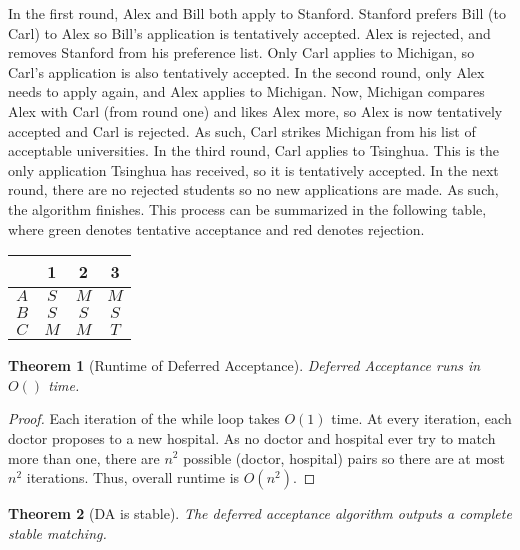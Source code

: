 \documentclass[dvipsnames]{article}
\newtheorem{theorem}{Theorem}[section]
\theoremstyle{definition}
\theoremstyle{remark}
\begin{document}
In the first round, Alex and Bill both apply to Stanford. Stanford prefers Bill (to Carl) to Alex so Bill's application is tentatively accepted. Alex is rejected, and removes Stanford from his preference list. Only Carl applies to Michigan, so Carl's application is also tentatively accepted. In the second round, only Alex needs to apply again, and Alex applies to Michigan. Now, Michigan compares Alex with Carl (from round one) and likes Alex more, so Alex is now tentatively accepted and Carl is rejected. As such, Carl strikes Michigan from his list of acceptable universities. In the third round, Carl applies to Tsinghua. This is the only application Tsinghua has received, so it is tentatively accepted. In the next round, there are no rejected students so no new applications are made. As such, the algorithm finishes. This process can be summarized in the following table, where green denotes tentative acceptance and red denotes rejection.

\begin{center}
	\begin{tabular}{ |c||c|c|c| } 	
		\hline
		& 1& 2 & 3 \\ 
		\hline
		\hline
		$A$ & \color{Red}$S$& \color{Green}$M$ & \color{Green}$M$  \\ 
		\hline
		$B$ & \color{Green}$S$ & \color{Green}$S$ & \color{Green}$S$\\ 
		\hline
		$C$ & \color{Green}$M$ & \color{Red}$M$ & \color{Green}$T$\\ 
		\hline
	\end{tabular}
\end{center} 

\begin{theorem}[Runtime of Deferred Acceptance]
	Deferred Acceptance runs in $O()$ time.
\end{theorem}

\begin{proof}
	Each iteration of the while loop takes $O(1)$ time. At every iteration, each doctor proposes to a new hospital. As no doctor and hospital ever try to match more than one, there are $n^2$ possible (doctor, hospital) pairs so there are at most $n^2$ iterations. Thus, overall runtime is $O(n^2)$.
\end{proof}

\begin{theorem}[DA is stable]
	The deferred acceptance algorithm outputs a complete stable matching.
\end{theorem}
\end{document}
